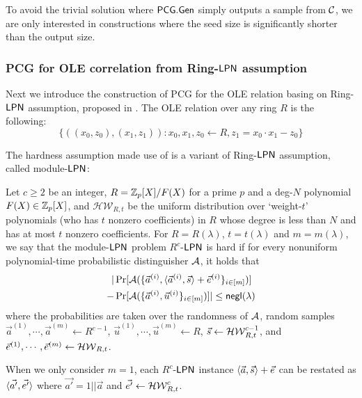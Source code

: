To avoid the trivial solution where ${\sf PCG}.{\sf Gen}$ simply outputs a sample from $\mathcal{C}$, we are only interested in constructions where the seed size is significantly shorter than the output size.

\subsubsection{PCG for OLE correlation from Ring-${\sf LPN}$ assumption \cite{cryptoeprint:2022/1035}}
Next we introduce the construction of PCG for the OLE relation basing on Ring-${\sf LPN}$ assumption, proposed in \cite{cryptoeprint:2022/1035}. The OLE relation over any ring $R$ is the following: 
\[
\{\left((x_0, z_0),(x_1,z_1)\right): x_0,x_1,z_0\gets R, z_1 = x_0\cdot x_1 - z_0\}
\]

The hardness assumption made use of is a variant of Ring-${\sf LPN}$ assumption, called module-${\sf LPN}$: 
\begin{definition}\label{def:module-LPN}
    Let $c\ge 2$ be an integer, $R = \mathbb{Z}_p[X]/F(X)$ for a prime $p$ and a deg-$N$ polynomial $F(X)\in \mathbb{Z}_p[X]$, and $\mathcal{HW}_{R,t}$ be the uniform distribution over `weight-$t$' polynomials (who has $t$ nonzero coefficients) in $R$ whose degree is less than $N$ and has at most $t$ nonzero coefficients. 
     For $R=R(\lambda)$, $t=t(\lambda)$ and $m=m(\lambda)$, we say that the module-${\sf LPN}$ problem $R^c$-${\sf LPN}$ is hard if for every nonuniform polynomial-time probabilistic distinguisher $\mathcal{A}$, it holds that 
    \begin{align*}
        |&\Pr[\mathcal{A}(\{\vec{a}^{(i)}, \langle \vec{a}^{(i)}, \vec{s} \rangle+\vec{e}^{(i)}\}_{i\in [m]})] \\
        -&\Pr[\mathcal{A}(\{\vec{a}^{(i)},\vec{u}^{(i)}\}_{i\in [m]})]| \le \mathsf{negl}(\lambda)
    \end{align*}
    where the probabilities are taken over the randomness of $\mathcal{A}$, random samples $\vec{a}^{(1)},\cdots, \vec{a}^{(m)}\leftarrow R^{c-1}$, $\vec{u}^{(1)},\cdots, \vec{u}^{(m)}\leftarrow R$, $\vec{s}\leftarrow \mathcal{HW}_{R,t}^{c-1}$, and $\vec{e}^{(1)},\cdots, \vec{e}^{(m)}\leftarrow \mathcal{HW}_{R,t}$. 

    When we only consider $m=1$, each $R^c$-${\sf LPN}$ instance $ \langle \vec{a}, \vec{s} \rangle+\vec{e}$ can be restated as $\langle \vec{a'}, \vec{e'} \rangle$ where $\vec{a'}=1||\vec{a}$ and $\vec{e'}\leftarrow \mathcal{HW}_{R,t}^c$. 
\end{definition}

